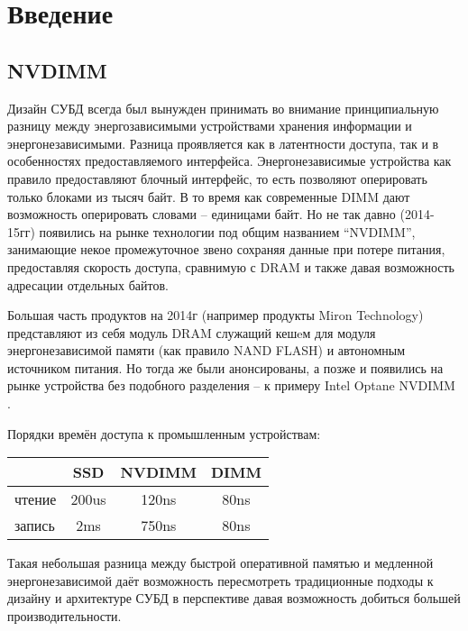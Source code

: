 \documentclass[pdftex,ptm,12pt,a4paper]{report}
\theoremstyle{definition}
\begin{document}
\tableofcontents
\sloppy

\parindent=1.25cm

\chapter{Введение}
\section{NVDIMM}
Дизайн СУБД всегда был вынужден принимать во внимание принципиальную разницу между энергозависимыми устройствами хранения информации и энергонезависимыми.
Разница проявляется как в латентности доступа, так и в особенностях предоставляемого интерфейса. Энергонезависимые устройства как правило предоставляют блочный интерфейс, то есть
позволяют оперировать только блоками из тысяч байт. В то время как современные DIMM дают возможность оперировать словами -- единицами байт.
Но не так давно (2014-15гг) появились на рынке технологии под общим названием “NVDIMM”, занимающие некое промежуточное звено сохраняя данные при потере питания, предоставляя скорость доступа, сравнимую с DRAM и также давая возможность адресации отдельных байтов.

Большая часть продуктов на 2014г (например продукты Miron Technology) представляют из себя модуль DRAM служащий кешeм для модуля энергонезависимой памяти (как правило NAND FLASH)
и автономным источником питания. Но тогда же были анонсированы, а позже и появились на рынке устройства без подобного разделения -- к примеру Intel Optane NVDIMM \cite{peng2019system}.

Порядки времён доступа к промышленным устройствам:
\begin{center}
\begin{tabular} {|l| c c c|}
\hline
    & SSD & NVDIMM & DIMM \\
    \hline
чтение & 200us & 120ns & 80ns \\
запись & 2ms & 750ns & 80ns \\
\hline
\end{tabular}
\end{center}

Такая небольшая разница между быстрой оперативной памятью и медленной энергонезависимой даёт возможность пересмотреть традиционные подходы к дизайну и архитектуре СУБД в перспективе давая возможность добиться большей производительности.
\end{document}
